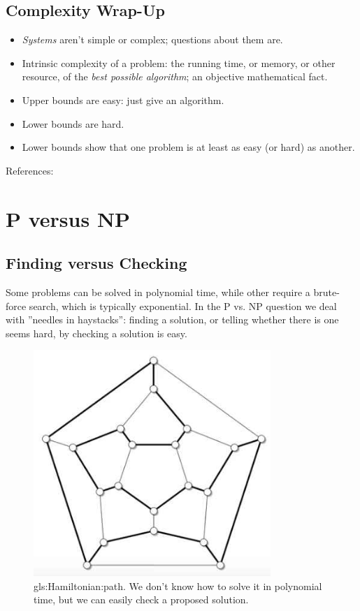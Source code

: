 \documentclass[]{article}
\begin{document}
\subsection{Complexity Wrap-Up}

\begin{itemize}
	\item \emph{Systems} aren't simple or complex; questions about them are.
	\item Intrinsic complexity of a problem: the running time, or memory, or other resource, of the \emph{best possible algorithm}; an objective mathematical fact.
	\item Upper bounds are easy: just give an algorithm.
	\item Lower bounds are hard.
	\item Lower bounds show that one problem is at least as easy (or hard) as another. 
\end{itemize}

References: \cite[Chapter 2]{moore2011nature}

\section{P versus NP}


\subsection{Finding versus Checking}

Some problems can be solved in polynomial time, while other require a brute-force search, which is typically exponential. In the P vs. NP question we deal with ''needles in haystacks'': finding a solution, or telling whether there is one seems hard, by checking a solution is easy.

\begin{figure}[H]
	\begin{center}
		\caption[Hamiltonian path]{\gls{gls:Hamiltonian:path}. We don't know how to solve it in polynomial time, but we can easily check a proposed solution.}\label{fig:PNP1}
		\includegraphics[width=0.8\textwidth]{PNP1}
	\end{center}
\end{figure} 
\end{document}

